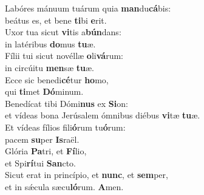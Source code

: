 \evenverse Labóres mánuum tuárum quia \textbf{man}du\textbf{cá}bis:~\*\\
\evenverse beátus es, et bene \textbf{ti}bi \textbf{e}rit.\\
\oddverse Uxor tua sicut \textbf{vi}tis a\textbf{bún}dans:~\*\\
\oddverse in latéribus \textbf{do}mus \textbf{tu}æ.\\
\evenverse Fílii tui sicut novéllæ \textbf{o}li\textbf{vá}rum:~\*\\
\evenverse in circúitu \textbf{men}sæ \textbf{tu}æ.\\
\oddverse Ecce sic benedi\textbf{cé}tur \textbf{ho}mo,~\*\\
\oddverse qui \textbf{ti}met \textbf{Dó}minum.\\
\evenverse Benedícat tibi Dómi\textbf{nus} ex \textbf{Si}on:~\*\\
\evenverse et vídeas bona Jerúsalem ómnibus diébus \textbf{vi}tæ \textbf{tu}æ.\\
\oddverse Et vídeas fílios fili\textbf{ó}rum tu\textbf{ó}rum:~\*\\
\oddverse pacem \textbf{su}per \textbf{Is}raël.\\
\evenverse Glória \textbf{Pa}tri, et \textbf{Fí}lio,~\*\\
\evenverse et Spi\textbf{rí}tui \textbf{San}cto.\\
\oddverse Sicut erat in princípio, et \textbf{nunc}, et \textbf{sem}per,~\*\\
\oddverse et in sǽcula sæcu\textbf{ló}rum. \textbf{A}men.\\
